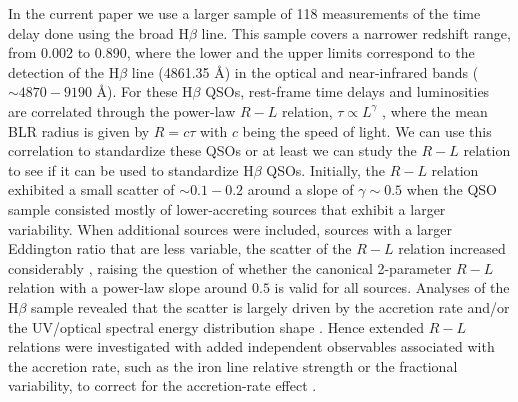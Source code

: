 \documentclass[a4paper,fleqn,usenatbib]{mnras}
\begin{document}
In the current paper we use a larger sample of 118 measurements of the time delay done using the broad H$\beta$ line. This sample covers a narrower redshift range, from 0.002 to 0.890, where the lower and the upper limits correspond to the detection of the H$\beta$ line (4861.35 \AA) in the optical and near-infrared bands ($\sim 4870-9190$ \AA). For these H$\beta$ QSOs, rest-frame time delays and luminosities are correlated through the power-law $R-L$ relation, $\tau\propto L^{\gamma}$ \citep{2000ApJ...533..631K,2005ApJ...629...61K,2013ApJ...767..149B}, where the mean BLR radius is given by $R=c\tau$ with $c$ being the speed of light. We can use this correlation to standardize these QSOs or at least we can study the $R-L$ relation to see if it can be used to standardize H$\beta$ QSOs. Initially, the $R-L$ relation exhibited a small scatter of $\sim 0.1-0.2$ around a slope of $\gamma\sim 0.5$ \citep{2013ApJ...767..149B} when the QSO sample consisted mostly of lower-accreting sources that exhibit a larger variability. When additional sources were included, sources with a larger Eddington ratio that are less variable, the scatter of the $R-L$ relation increased considerably \citep{du2015, du2016,2017ApJ...851...21G,2018ApJ...856....6D}, raising the question of whether the canonical 2-parameter $R-L$ relation with a power-law slope around $0.5$ is valid for all sources. Analyses of the H$\beta$ sample revealed that the scatter is largely driven by the accretion rate and/or the UV/optical spectral energy distribution shape \citep{du2015, du2016,2018ApJ...856....6D, Mary2019,2020ApJ...903..112D,2020ApJ...899...73F}. Hence extended $R-L$ relations were investigated with added independent observables associated with the accretion rate, such as the iron line relative strength or the fractional variability, to correct for the accretion-rate effect \citep{duwang_2019,Mary2020}.
\end{document}
